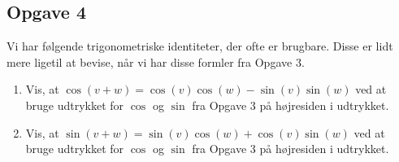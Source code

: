 \subsection*{Opgave 4}
Vi har følgende trigonometriske identiteter, der ofte er brugbare. Disse er lidt mere ligetil at bevise, når vi har disse formler fra Opgave 3.
\begin{enumerate}[label=\roman*)]
	\item Vis, at $\cos(v + w) = \cos(v)\cos(w) - \sin(v)\sin(w)$ ved at bruge udtrykket for $\cos$ og $\sin$ fra
	 Opgave 3 på højresiden i udtrykket.
	\item Vis, at $\sin(v + w) = \sin(v)\cos(w) + \cos(v)\sin(w)$ ved at bruge udtrykket for $\cos$ og $\sin$ fra 
	Opgave 3 på højresiden i udtrykket. 
	
\end{enumerate}